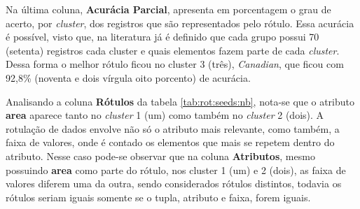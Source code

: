Na última coluna, \textbf{Acurácia Parcial}, apresenta em porcentagem o grau de acerto, por \textit{cluster}, dos registros que são representados pelo rótulo. Essa acurácia é possível, visto que, na literatura já é definido que cada grupo possui 70 (setenta) registros cada cluster e quais elementos fazem parte de cada \textit{cluster}. Dessa forma o melhor rótulo ficou no cluster 3 (três), \textit{Canadian}, que ficou com 92,8\% (noventa e dois vírgula oito porcento) de acurácia.

Analisando a coluna \textbf{Rótulos} da tabela \ref{tab:rot:seeds:nb}, nota-se que o atributo \textbf{area} aparece tanto no  \textit{cluster} 1 (um) como também no \textit{cluster} 2 (dois). A rotulação de dados envolve não só o atributo mais relevante, como também, a faixa de valores, onde é contado os elementos que mais se repetem dentro do atributo. Nesse caso pode-se observar que na coluna \textbf{Atributos}, mesmo possuindo  \textbf{area} como parte do rótulo, nos cluster  1 (um) e 2 (dois), as faixa de valores diferem uma da outra, sendo considerados rótulos distintos, todavia os rótulos seriam iguais somente se o tupla, atributo e faixa, forem iguais.



